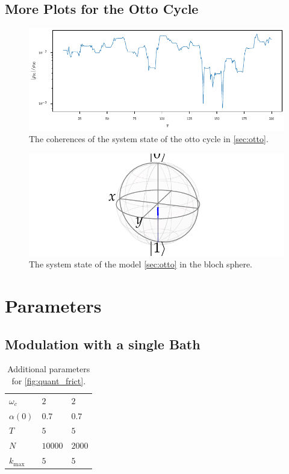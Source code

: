 \subsection{More Plots for the Otto Cycle}
\label{sec:otto_plots}
\begin{figure}[H]
  \centering
  \includegraphics{figs/otto/coherences}
  \caption{\label{eq:otto_coherences} The coherences of the system
    state of the otto cycle in \cref{sec:otto}.}
\end{figure}
\begin{figure}[H]
  \centering
  \includegraphics{figs/otto/bloch}
  \caption{\label{eq:otto_bloch} The system state of the model
    \cref{sec:otto} in the bloch sphere.}
\end{figure}

\section{Parameters}
\label{sec:plus_params}
\subsection{Modulation with a single Bath}
\label{sec:plus_mod_single}

\begin{table}[H]
  \centering
  \begin{tabular}{lll}
    \hline
    $ω_c$              & $2$     & $2$    \\
    $α(0)$             & $0.7$   & $0.7$  \\
    $T$                & $5$     & $5$    \\
    $N$                & $10000$ & $2000$ \\
    $k_{\mathrm{max}}$ & $5$     & $5$    \\
    \hline
  \end{tabular}
  \caption{\label{tab:plus_friction}Additional parameters for
    \cref{fig:quant_frict}.}
\end{table}


